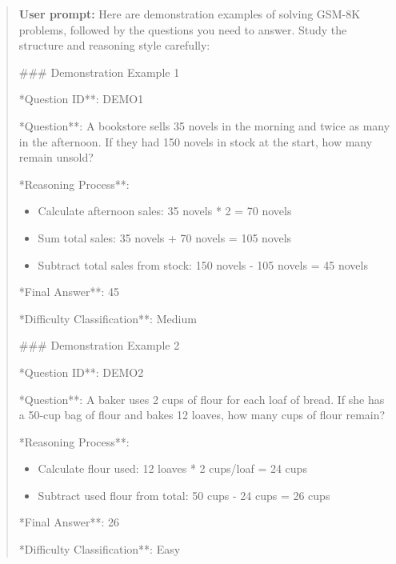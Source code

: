 \documentclass[a4paper,12pt]{article}
\begin{document}
\begin{quote}
    \textbf{User prompt:} Here are demonstration examples of solving GSM-8K problems, followed by the questions you need to answer. Study the structure and reasoning style carefully:

    \#\#\# Demonstration Example 1
    \item **Question ID**: DEMO1  
        \item **Question**: A bookstore sells 35 novels in the morning and twice as many in the afternoon. If they had 150 novels in stock at the start, how many remain unsold?  
        \item **Reasoning Process**:  
        \begin{itemize}
            \item Calculate afternoon sales: 35 novels * 2 = 70 novels  
            \item Sum total sales: 35 novels + 70 novels = 105 novels  
            \item Subtract total sales from stock: 150 novels - 105 novels = 45 novels  
        \end{itemize}
        \item **Final Answer**: 45  
        \item **Difficulty Classification**: Medium  

        \#\#\# Demonstration Example 2
        \item **Question ID**: DEMO2  
        \item **Question**: A baker uses 2 cups of flour for each loaf of bread. If she has a 50-cup bag of flour and bakes 12 loaves, how many cups of flour remain?  
        \item **Reasoning Process**:  
        \begin{itemize}
            \item Calculate flour used: 12 loaves * 2 cups/loaf = 24 cups  
            \item Subtract used flour from total: 50 cups - 24 cups = 26 cups  
        \end{itemize}
        \item **Final Answer**: 26  
        \item **Difficulty Classification**: Easy  


\end{quote}
\end{document}
